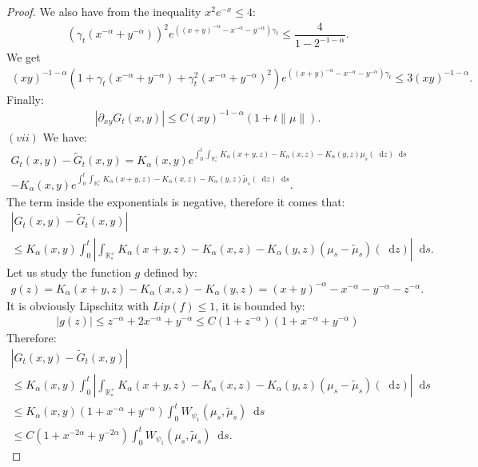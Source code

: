 \documentclass[11pt,a4paper]{article}
\newcommand{\RRP}{\mathbb{R}^+_*}
\newcommand{\dd}{\mathop{}\!\mathrm{d}}
\begin{document}
\begin{proof}
    We also have from the inequality $x^2 e^{-x} \leq 4$:
    \begin{align*}
        \left(\gamma_t (x^{-\alpha} + y^{-\alpha})\right)^2 e^{\left((x+y)^{-\alpha} - x^{-\alpha}- y^{-\alpha}\right)\gamma_t}  \leq \dfrac{4}{1-2^{-1-\alpha}}.
    \end{align*}
    We get 
    \begin{align*}
        (xy)^{-1-\alpha}\left( 1 + \gamma_t (x^{-\alpha} + y^{-\alpha}) + \gamma_t^2  (x^{-\alpha} + y^{-\alpha})^2\right)e^{\left((x+y)^{-\alpha} - x^{-\alpha}- y^{-\alpha}\right)\gamma_t} 
        \leq 3(xy)^{-1-\alpha}.
    \end{align*}
    Finally:
    \begin{align*}
        \left|\partial_{xy}G_t(x,y) \right| \leq C(xy)^{-1-\alpha} \left(1 + t\|\mu\| \right).
    \end{align*}
    $(vii)$ We have:
    \begin{multline*}
        G_t(x,y)- \tilde{G}_t(x,y) = K_\alpha(x,y) e^{\int_0^t \int_{\RRP} K_\alpha(x+y,z) - K_\alpha(x,z) -K_\alpha(y,z)\mu_s(\dd z) \dd s} \\
        - K_\alpha(x,y)e^{\int_0^t \int_{\RRP} K_\alpha(x+y,z) - K_\alpha(x,z) -K_\alpha(y,z)\tilde{\mu}_s(\dd z) \dd s}.
    \end{multline*}
    The term inside the exponentials is negative, therefore it comes that:
    \begin{multline*}
        \left| G_t(x,y)- \tilde{G}_t(x,y) \right|\\
         \leq K_\alpha(x,y)\int_0^t\left| \int_{\RRP} K_\alpha(x+y,z) - K_\alpha(x,z) -K_\alpha(y,z)\left( \mu_s - \tilde{\mu}_s\right)(\dd z) \right|\dd s.
    \end{multline*}
    Let us study the function $g$ defined by:
    \begin{align*}
        g(z) = K_\alpha(x+y,z) - K_\alpha(x,z) -K_\alpha(y,z) = (x+y)^{-\alpha} -x^{-\alpha} - y^{-\alpha} - z^{-\alpha}.
    \end{align*}
    It is obviously Lipschitz with $Lip(f) \leq 1$, it is bounded by: 
    \begin{align*}
        |g(z)| \leq z^{-\alpha} + 2x^{-\alpha} + y^{-\alpha} \leq C(1 + z^{-\alpha})(1 + x^{-\alpha} + y^{-\alpha})
    \end{align*}
    Therefore:
    \begin{multline*}
        \left| G_t(x,y)- \tilde{G}_t(x,y) \right|\\ \leq K_\alpha(x,y)\int_0^t\left| \int_{\RRP} K_\alpha(x+y,z) - K_\alpha(x,z) -K_\alpha(y,z)\left( \mu_s - \tilde{\mu}_s\right)(\dd z) \right|\dd s \\
        \leq K_\alpha(x,y)(1 + x^{-\alpha} + y^{-\alpha}) \int_0^t W_{\psi_1}(\mu_s,\tilde{\mu}_s) \dd s\\
        \leq C(1 + x^{-2\alpha} + y^{-2\alpha})\int_0^t W_{\psi_1}(\mu_s,\tilde{\mu}_s) \dd s.
    \end{multline*}
    

\end{proof}
\end{document}
